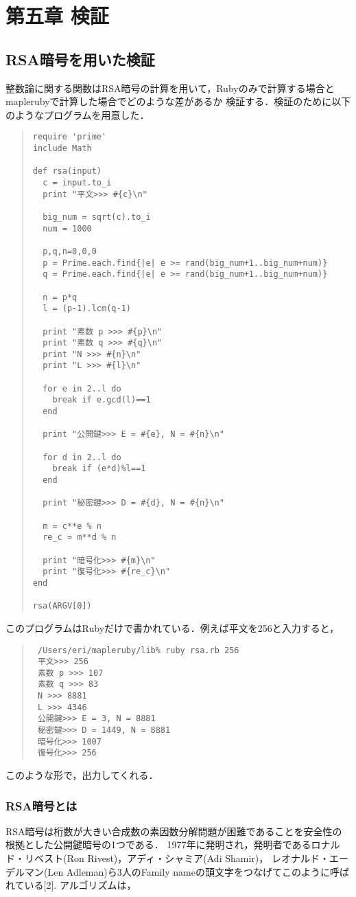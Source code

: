 \section{第五章 検証}
\subsection{RSA暗号を用いた検証}
整数論に関する関数はRSA暗号の計算を用いて，Rubyのみで計算する場合とmaplerubyで計算した場合でどのような差があるか
検証する．検証のために以下のようなプログラムを用意した．
\begin{quote}\begin{verbatim}
require 'prime'
include Math

def rsa(input)
  c = input.to_i
  print "平文>>> #{c}\n"
  
  big_num = sqrt(c).to_i
  num = 1000
  
  p,q,n=0,0,0
  p = Prime.each.find{|e| e >= rand(big_num+1..big_num+num)}
  q = Prime.each.find{|e| e >= rand(big_num+1..big_num+num)}
  
  n = p*q
  l = (p-1).lcm(q-1)
  
  print "素数 p >>> #{p}\n"
  print "素数 q >>> #{q}\n"
  print "N >>> #{n}\n"
  print "L >>> #{l}\n"
  
  for e in 2..l do
    break if e.gcd(l)==1
  end
  
  print "公開鍵>>> E = #{e}, N = #{n}\n"
  
  for d in 2..l do
    break if (e*d)%l==1
  end
  
  print "秘密鍵>>> D = #{d}, N = #{n}\n"
  
  m = c**e % n
  re_c = m**d % n
  
  print "暗号化>>> #{m}\n"
  print "復号化>>> #{re_c}\n"
end

rsa(ARGV[0])
\end{verbatim}\end{quote}
このプログラムはRubyだけで書かれている．例えば平文を256と入力すると，
\begin{quote}\begin{verbatim}
 /Users/eri/mapleruby/lib% ruby rsa.rb 256
 平文>>> 256
 素数 p >>> 107
 素数 q >>> 83
 N >>> 8881
 L >>> 4346
 公開鍵>>> E = 3, N = 8881
 秘密鍵>>> D = 1449, N = 8881
 暗号化>>> 1007
 復号化>>> 256
\end{verbatim}\end{quote}
このような形で，出力してくれる．

\subsubsection{RSA暗号とは}
RSA暗号は桁数が大きい合成数の素因数分解問題が困難であることを安全性の根拠とした公開鍵暗号の1つである．
1977年に発明され，発明者であるロナルド・リベスト(Ron Rivest)，アディ・シャミア(Adi Shamir)，
レオナルド・エーデルマン(Len Adleman)ら3人のFamily nameの頭文字をつなげてこのように呼ばれている[2].
アルゴリズムは，

